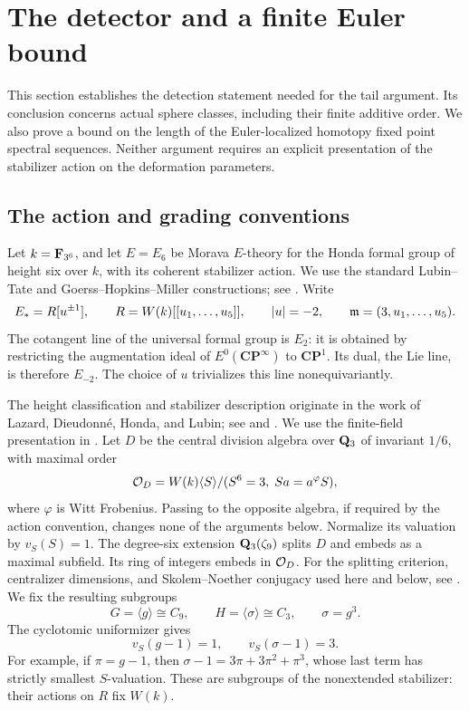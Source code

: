 \section{The detector and a finite Euler bound}\label{sec:detector}

This section establishes the detection statement needed for the tail
argument.  Its conclusion concerns actual sphere classes, including
their finite additive order.  We also prove a bound on the length of
the Euler-localized homotopy fixed point spectral sequences.  Neither
argument requires an explicit presentation of the stabilizer action
on the deformation parameters.

\subsection{The action and grading conventions}

Let \(k=\mathbf F_{3^6}\), and let \(E=E_6\) be Morava \(E\)-theory for the
Honda formal group of height six over \(k\), with its coherent
stabilizer action.  We use the standard Lubin--Tate and
Goerss--Hopkins--Miller constructions; see \cite{LubinTate,GH}.
Write
\begin{equation}\label{det:coefficients}
 E_* = R[u^{\pm1}],\qquad
 R=W(k)[[u_1,\ldots,u_5]],\qquad
 |u|=-2,\qquad
 \mathfrak m=(3,u_1,\ldots,u_5).
\end{equation}
The cotangent line of the universal formal group is \(E_2\):
it is obtained by restricting the augmentation ideal of
\(E^0(\mathbf{CP}^{\infty})\) to \(\mathbf{CP}^1\).
Its dual, the Lie line, is therefore \(E_{-2}\).
The choice of \(u\) trivializes this line nonequivariantly.

The height classification and stabilizer description originate in
the work of Lazard, Dieudonn\'e, Honda, and Lubin;
see \cite[Theorem~IV]{Lazard} and \cite[Theorem~1]{Honda}.
We use the finite-field presentation in
\cite[Appendix~A2.2.12 and A2.2.17--18]{Ravenel}.
Let \(D\) be the central division algebra over \(\mathbf Q_3\) of invariant
\(1/6\), with maximal order
\[
 \mathcal O_D=
 W(k)\langle S\rangle/(S^6=3,\;Sa=a^\varphi S),
\]
where \(\varphi\) is Witt Frobenius.  Passing to the opposite algebra,
if required by the action convention, changes none of the arguments
below.  Normalize its valuation by \(v_S(S)=1\).
The degree-six extension \(\mathbf Q_3(\zeta_9)\) splits \(D\) and embeds as a
maximal subfield.  Its ring of integers embeds in \(\mathcal O_D\).
For the splitting criterion, centralizer dimensions, and
Skolem--Noether conjugacy used here and below, see
\cite[Chapter~IV, Theorems~2.10 and~3.1, Corollary~3.7, and Remark~4.4(c)]{MilneCFT}.
We fix the resulting subgroups
\begin{equation}\label{det:groups}
 G=\langle g\rangle\cong C_9,\qquad
 H=\langle \sigma\rangle\cong C_3,\qquad
 \sigma=g^3 .
\end{equation}
The cyclotomic uniformizer gives
\begin{equation}\label{det:valuations}
 v_S(g-1)=1,\qquad v_S(\sigma-1)=3.
\end{equation}
For example, if \(\pi=g-1\), then
\(\sigma-1=3\pi+3\pi^2+\pi^3\), whose last term has strictly
smallest \(S\)-valuation.  These are subgroups of the nonextended
stabilizer: their actions on \(R\) fix \(W(k)\).

